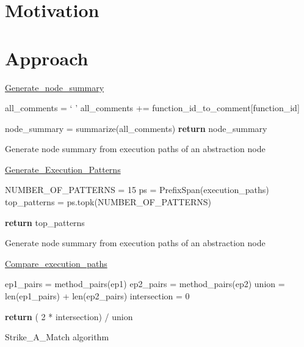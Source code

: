 \section{Motivation}

\section{Approach}


\begin{algorithm}

    \underline{Generate\_node\_summary} 
    
    all\_comments = ` '\;
    {
        {
            all\_comments += function\_id\_to\_comment[function\_id]\;
        }
    }
    
    node\_summary = summarize(all\_comments)\; 
    \textbf{return} node\_summary
    \caption{Generate node summary from execution paths of an abstraction node}
    \label{alg:node_summary}
\end{algorithm}

\begin{algorithm}
    
    \underline{Generate\_Execution\_Patterns} 
    
    NUMBER\_OF\_PATTERNS = 15\;
    ps = PrefixSpan(execution\_paths)\;
    top\_patterns = ps.topk(NUMBER\_OF\_PATTERNS)\; 
    
    \textbf{return} top\_patterns\;
    \caption{Generate node summary from execution paths of an abstraction node}
    \label{alg:node_summary}
\end{algorithm}



\begin{algorithm}
    
    \underline{Compare\_execution\_paths} 
    
    ep1\_pairs = method\_pairs(ep1)\; 
    ep2\_pairs = method\_pairs(ep2)\;
    union = len(ep1\_pairs) + len(ep2\_pairs)\;
    intersection = 0\;
    
    \textbf{return} ( 2 * intersection) / union
    
    \caption{Strike\_A\_Match algorithm}
    \label{alg:strike_a_match}
\end{algorithm}



